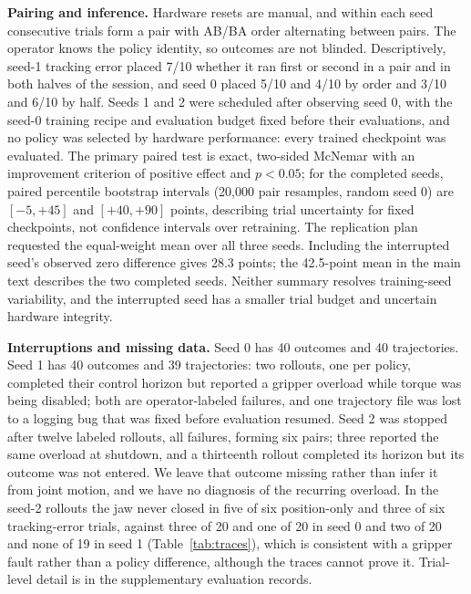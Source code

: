 \documentclass{article}
\begin{document}
\textbf{Pairing and inference.} Hardware resets are manual, and within each
seed consecutive trials form a pair with AB/BA order alternating between pairs.
The operator knows the policy identity, so outcomes are not blinded. Descriptively,
seed-1 tracking error placed 7/10 whether it ran first
or second in a pair and in both halves of the session, and seed 0 placed 5/10
and 4/10 by order and 3/10 and 6/10 by half. Seeds 1
and 2 were scheduled after observing seed 0, with the seed-0 training recipe and
evaluation budget fixed before their evaluations, and no policy was selected by
hardware performance: every trained checkpoint was evaluated. The primary paired test is exact, two-sided McNemar with
an improvement criterion of positive effect and $p<0.05$; for the completed
seeds, paired percentile bootstrap intervals (20,000 pair resamples, random
seed 0) are $[-5,+45]$ and $[+40,+90]$ points, describing trial uncertainty
for fixed checkpoints, not confidence intervals over retraining. The replication
plan requested the equal-weight mean over all three seeds. Including the
interrupted seed's observed zero difference gives 28.3 points; the 42.5-point
mean in the main text describes the two completed seeds. Neither summary
resolves training-seed variability, and the interrupted seed has a smaller
trial budget and uncertain hardware integrity.

\textbf{Interruptions and missing data.} Seed 0 has 40 outcomes and 40
trajectories. Seed 1 has 40 outcomes and 39 trajectories: two rollouts, one per
policy, completed their control horizon but reported a gripper overload while
torque was being disabled; both are operator-labeled failures, and one
trajectory file was lost to a logging bug that was fixed before evaluation
resumed. Seed 2 was stopped after twelve labeled rollouts, all failures,
forming six pairs; three reported the same overload at shutdown, and a
thirteenth rollout completed its horizon but its outcome was not entered. We
leave that outcome missing rather than infer it from joint motion, and we have
no diagnosis of the recurring overload. In the seed-2 rollouts the jaw never
closed in five of six position-only and three of six tracking-error trials,
against three of 20 and one of 20 in seed 0 and two of 20 and none of 19 in
seed 1 (Table~\ref{tab:traces}), which is consistent with a gripper fault
rather than a policy difference, although the traces cannot prove it.
Trial-level detail is in the supplementary evaluation records.
\end{document}
